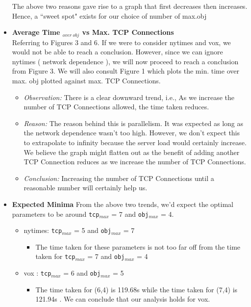 \documentclass[12pt]{article}
\begin{document}
\begin{itemize}
The above two reasons gave rise to a graph that first decreases then increases. Hence, a ``sweet spot" exists for our choice of number of max.obj
\item \textbf{Average Time $_{over\ obj}$ vs Max. TCP Connections}\\
Referring to Figures 3 and 6. If we were to consider nytimes and vox, we would not be able to reach a conclusion. However, since we can ignore nytimes ( network dependence ), we will now proceed to reach a conclusion from Figure 3. We will also consult Figure 1 which plots the min. time over max. obj plotted against max. TCP Connections.
\begin{itemize}
\item \textit{Observation:} There is a clear downward trend, i.e., As we increase the number of TCP Connections allowed, the time taken reduces.
\item \textit{Reason:} The reason behind this is parallelism. It was expected as long as the network dependence wasn't too high. However, we don't expect this to extrapolate to infinity because the server load would certainly increase. We believe the graph might flatten out as the benefit of adding another TCP Connection reduces as we increase the number of TCP Connections.
\item \textit{Conclusion:} Increasing the number of TCP Connections until a reasonable number will certainly help us.
\end{itemize}
\item \textbf{Expected Minima} From the above two trends, we'd expect the optimal parameters to be around \texttt{tcp}$_{max}$ = 7 and \texttt{obj}$_{max}$ = 4.
\begin{itemize}
\item nytimes: \texttt{tcp}$_{max}$ = 5 and \texttt{obj}$_{max}$ = 7
\\ \begin{itemize}
\item The time taken for these parameters is not too far off from the time taken for \texttt{tcp}$_{max}$ = 7 and \texttt{obj}$_{max}$ = 4
\end{itemize}
\item vox : \texttt{tcp}$_{max}$ = 6 and \texttt{obj}$_{max}$ = 5
\\ \begin{itemize}
\item The time taken for (6,4) is 119.68s while the time taken for (7,4) is 121.94s . We can conclude that our analysis holds for vox.
\end{itemize}
\end{itemize}

\end{itemize}
\end{document}
